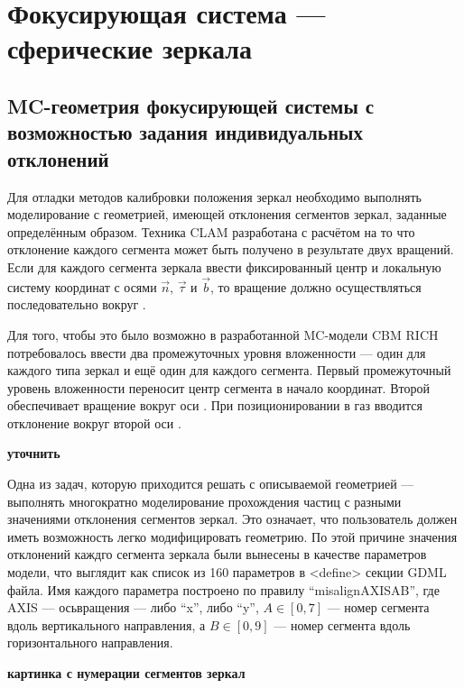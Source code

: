 \section{Фокусирующая система --- сферические зеркала}\label{sec:secRICHgeoMirror}

\subsection{MC-геометрия фокусирующей системы с возможностью задания индивидуальных отклонений}\label{sec:secRICHgeoMirrorMis}

Для отладки методов калибровки положения зеркал необходимо выполнять моделирование с геометрией, имеющей отклонения сегментов зеркал, заданные определённым образом. Техника \todo CLAM разработана с расчётом на то что отклонение каждого сегмента может быть получено в результате двух вращений. Если для каждого сегмента зеркала ввести фиксированный центр и локальную систему координат с осями $\overrightarrow{n}$, $\overrightarrow{\tau}$ и $\overrightarrow{b}$, то вращение должно осуществляться последовательно вокруг \todo.

Для того, чтобы это было возможно в разработанной MC-модели CBM RICH потребовалось ввести два промежуточных уровня вложенности --- один для каждого типа зеркал и ещё один для каждого сегмента. Первый промежуточный уровень вложенности переносит центр сегмента в начало координат. Второй обеспечивает вращение вокруг оси \todo. При позиционировании в газ вводится отклонение вокруг второй оси \todo.

\todo \textbf{уточнить}

Одна из задач, которую приходится решать с описываемой геометрией --- выполнять многократно моделирование прохождения частиц с разными значениями отклонения сегментов зеркал. Это означает, что пользователь должен иметь возможность легко модифицировать геометрию. По этой причине значения отклонений каждго сегмента зеркала были вынесены в качестве параметров модели, что выглядит как список из 160 параметров в <define> секции GDML файла. Имя каждого параметра построено по правилу ``misalign\textunderscore AXIS\textunderscore A\textunderscore B'', где AXIS --- осьвращения --- либо ``x'', либо ``y'', $A \in [0,7]$ --- номер сегмента вдоль вертикального направления, а $B \in [0,9]$ --- номер сегмента вдоль горизонтального направления.

\todo \textbf{картинка с нумерации сегментов зеркал}

